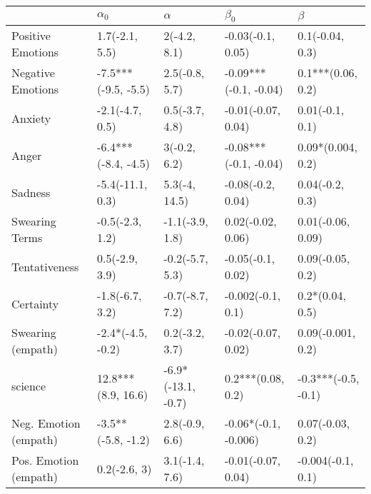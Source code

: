 \begin{tabular}{lllll}
\toprule
{} &           $\alpha_0$ &            $\alpha$ &              $\beta_0$ &              $\beta$ \\
\midrule
Positive Emotions     &       1.7(-2.1, 5.5) &        2(-4.2, 8.1) &      -0.03(-0.1, 0.05) &      0.1(-0.04, 0.3) \\
Negative Emotions     &  -7.5***(-9.5, -5.5) &      2.5(-0.8, 5.7) &  -0.09***(-0.1, -0.04) &    0.1***(0.06, 0.2) \\
Anxiety               &      -2.1(-4.7, 0.5) &      0.5(-3.7, 4.8) &     -0.01(-0.07, 0.04) &      0.01(-0.1, 0.1) \\
Anger                 &  -6.4***(-8.4, -4.5) &        3(-0.2, 6.2) &  -0.08***(-0.1, -0.04) &    0.09*(0.004, 0.2) \\
Sadness               &     -5.4(-11.1, 0.3) &       5.3(-4, 14.5) &      -0.08(-0.2, 0.04) &      0.04(-0.2, 0.3) \\
Swearing Terms        &      -0.5(-2.3, 1.2) &     -1.1(-3.9, 1.8) &      0.02(-0.02, 0.06) &    0.01(-0.06, 0.09) \\
Tentativeness         &       0.5(-2.9, 3.9) &     -0.2(-5.7, 5.3) &      -0.05(-0.1, 0.02) &     0.09(-0.05, 0.2) \\
Certainty             &      -1.8(-6.7, 3.2) &     -0.7(-8.7, 7.2) &      -0.002(-0.1, 0.1) &      0.2*(0.04, 0.5) \\
Swearing (empath)     &    -2.4*(-4.5, -0.2) &      0.2(-3.2, 3.7) &     -0.02(-0.07, 0.02) &    0.09(-0.001, 0.2) \\
science               &   12.8***(8.9, 16.6) &  -6.9*(-13.1, -0.7) &      0.2***(0.08, 0.2) &  -0.3***(-0.5, -0.1) \\
Neg. Emotion (empath) &   -3.5**(-5.8, -1.2) &      2.8(-0.9, 6.6) &   -0.06*(-0.1, -0.006) &     0.07(-0.03, 0.2) \\
Pos. Emotion (empath) &         0.2(-2.6, 3) &      3.1(-1.4, 7.6) &     -0.01(-0.07, 0.04) &    -0.004(-0.1, 0.1) \\
\bottomrule
\end{tabular}
